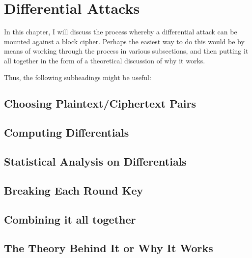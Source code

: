 



\chapter{Differential Attacks} \label{c:differential attacks}

In this chapter, I will discuss the process whereby a differential
attack can be mounted against a block cipher. Perhaps the easiest
way to do this would be by means of working through the process
in various subsections, and then putting it all together in the
form of a theoretical discussion of why it works.

Thus, the following subheadings might be useful:

\section{Choosing Plaintext/Ciphertext Pairs}

\section{Computing Differentials}

\section{Statistical Analysis on Differentials}

\section{Breaking Each Round Key}

\section{Combining it all together}

\section{The Theory Behind It or Why It Works}


